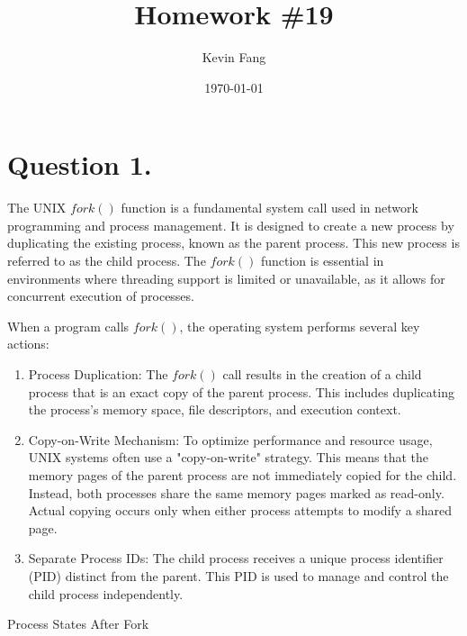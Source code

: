 \documentclass[titlepage]{article}\pagestyle{empty}
\author{Kevin Fang}
\title{Homework \#19}
\date{\today}
\begin{document}
\maketitle

\pagebreak
\section*{Question 1.}
The UNIX $fork()$ function is a fundamental system call used in network programming and process management. It is designed to create a new process by duplicating the existing process, known as the parent process. This new process is referred to as the child process. The $fork()$ function is essential in environments where threading support is limited or unavailable, as it allows for concurrent execution of processes.

When a program calls $fork()$, the operating system performs several key actions:

\begin{enumerate}
  \item Process Duplication: The $fork()$ call results in the creation of a child process that is an exact copy of the parent process. This includes duplicating the process's memory space, file descriptors, and execution context.


  \item Copy-on-Write Mechanism: To optimize performance and resource usage, UNIX systems often use a "copy-on-write" strategy. This means that the memory pages of the parent process are not immediately copied for the child. Instead, both processes share the same memory pages marked as read-only. Actual copying occurs only when either process attempts to modify a shared page.


  \item Separate Process IDs: The child process receives a unique process identifier (PID) distinct from the parent. This PID is used to manage and control the child process independently.
\end{enumerate}

Process States After Fork
\end{document}
